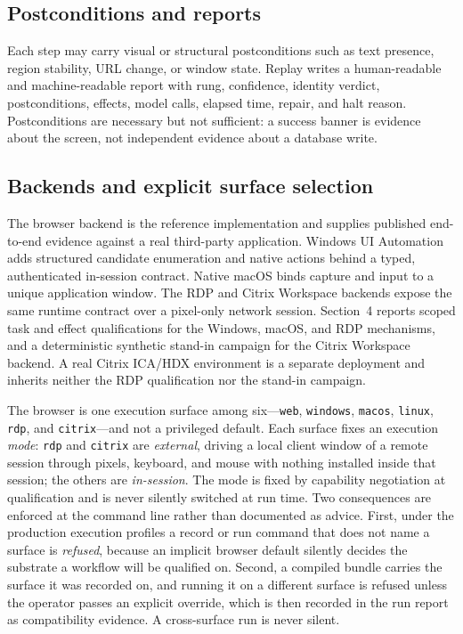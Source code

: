 \subsection{Postconditions and reports}
Each step may carry visual or structural postconditions such as text presence,
region stability, URL change, or window state. Replay writes a human-readable
and machine-readable report with rung, confidence, identity verdict,
postconditions, effects, model calls, elapsed time, repair, and halt reason.
Postconditions are necessary but not sufficient: a success banner is evidence
about the screen, not independent evidence about a database write.

\subsection{Backends and explicit surface selection}
The browser backend is the reference implementation and supplies published
end-to-end evidence against a real third-party application. Windows UI
Automation adds structured candidate enumeration and native actions behind a
typed, authenticated in-session contract. Native macOS binds capture and input
to a unique application window. The RDP and Citrix Workspace backends expose the
same runtime contract over a pixel-only network session. Section~4 reports
scoped task and effect qualifications for the Windows, macOS, and RDP
mechanisms, and a deterministic synthetic stand-in campaign for the Citrix
Workspace backend. A real Citrix ICA/HDX environment is a separate deployment
and inherits neither the RDP qualification nor the stand-in campaign.

The browser is one execution surface among six---\texttt{web},
\texttt{windows}, \texttt{macos}, \texttt{linux}, \texttt{rdp}, and
\texttt{citrix}---and not a privileged default. Each surface fixes an execution
\emph{mode}: \texttt{rdp} and \texttt{citrix} are \emph{external}, driving a
local client window of a remote session through pixels, keyboard, and mouse with
nothing installed inside that session; the others are \emph{in-session}. The
mode is fixed by capability negotiation at qualification and is never silently
switched at run time. Two consequences are enforced at the command line rather
than documented as advice. First, under the production execution profiles a
record or run command that does not name a surface is \emph{refused}, because an
implicit browser default silently decides the substrate a workflow will be
qualified on. Second, a compiled bundle carries the surface it was recorded on,
and running it on a different surface is refused unless the operator passes an
explicit override, which is then recorded in the run report as compatibility
evidence. A cross-surface run is never silent.

